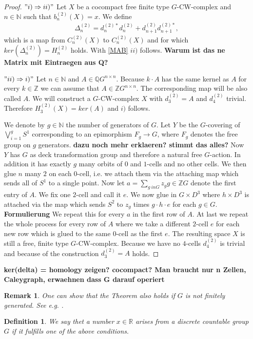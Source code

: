 \documentclass[12pt,a4paper]{scrartcl}
\newtheorem{Definition}[Theorem]{Definition}
\newtheorem{Remark}[Theorem]{Remark}
\numberwithin{equation}{section}
\newcommand{\R}{\mathbb{R}} %
\newcommand{\Q}{\mathbb{Q}} %
\newcommand{\Z}{\mathbb{Z}} %
\newcommand{\N}{\mathbb{N}} %
\newcommand{\2}{\mathbb{Z} / 2 \mathbb{Z}}
\newcommand{\1}{\overline{1}}
\newcommand{\0}{\overline{0}}
\begin{document}
\begin{proof}
	$"i) \Rightarrow ii)"$ Let $X$ be a cocompact free finite type $G$-CW-complex and $n \in \N$ such that $b_n^{(2)}(X)=x$. We define 
	\begin{align*}
		\Delta_n^{(2)} = d_n^{(2)*} d_n^{(2)} + d_{n+1}^{(2)} d_{n+1}^{(2)*},
	\end{align*}
	which is a map from $C_n^{(2)}(X)$ to $C_n^{(2)}(X)$ and for which $ker(\Delta_n^{(2)}) = H_n^{(2)}$ holds. With \ref{MAB} $ii)$ follows. \textbf{Warum ist das ne Matrix mit Eintraegen aus Q?}
	
	$"ii) \Rightarrow i)"$ Let $n \in \N$ and $A\in \Q G^{n \times n}$. Because $k \cdot A$ has the same kernel as $A$ for every $k \in \Z$ we can assume that $A \in \Z G^{n \times n}$. The corresponding map will be also called $A$.   We will construct a $G$-CW-complex $X$ with $d_3^{(2)} = A$ and $d_4^{(2)}$ trivial. Therefore $H_3^{(2)}(X) = ker(A)$ and $i)$ follows.
	
	We denote by $g \in \N$ the number of generators of $G$. Let $Y$ be the $G$-covering of $\bigvee_{i = 1}^{g} S^1$ corresponding to an epimorphism $F_g \to G$, where $F_g$ denotes the free group on $g$ generators. \textbf{dazu noch mehr erklaeren? stimmt das alles?} Now $Y$ has $G$ as deck transformation group and therefore a natural free $G$-action. In addition it has exactly $g$ many orbits of $0$ and $1$-cells and no other cells. We then glue $n$ many $2$ on each $0$-cell, i.e. we attach them via the attaching map which sends all of $S^1$ to a single point. Now let $a = \sum_{g \ in G} z_g g \in \Z G$ denote the first entry of $A$. We fix one $2$-cell and call it $e$. We now glue in $G \times D^3$ where $h \times D^3$ is attached via the map which sends $S^2$ to $z_g$ times $g \cdot h \cdot e$ for each $g \in G$.  \textbf{Formulierung} We repeat this for every $a$ in the first row of $A$. At last we repeat the whole process for every row of $A$ where we take a different $2$-cell $e$ for each new row which is glued to the same $0$-cell as the first $e$. The resulting space $X$ is still a free, finite type $G$-CW-complex. Because we have no $4$-cells $d_4^{(2)}$ is trivial and because of the construction $d_3^{(2)} = A$ holds.  
\end{proof}
\textbf{ker(delta) = homology zeigen? cocompact? Man braucht nur n Zellen, Caleygraph, erwaehnen dass G darauf operiert}
\begin{Remark}
	One can show that the Theorem also holds if $G$ is not finitely generated. See e.g. \cite[p. 371]{LUECK}.
\end{Remark}
\begin{Definition}
	We say thet a number $x \in \R$ arises from a discrete countable group $G$ if it fulfills one of the above conditions.
\end{Definition}
\end{document}
